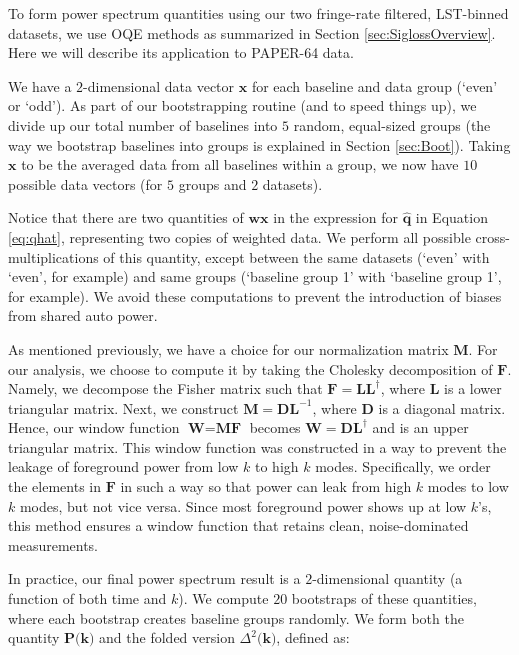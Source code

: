 \documentclass[preprint2,numberedappendix,tighten,twocolappendix]{aastex6}  %
\begin{document}
To form power spectrum quantities using our two fringe-rate filtered, LST-binned datasets, we use OQE methods as summarized in Section \ref{sec:SiglossOverview}. Here we will describe its application to PAPER-64 data. 

We have a $2$-dimensional data vector $\textbf{x}$ for each baseline and data group (`even' or `odd'). As part of our bootstrapping routine (and to speed things up), we divide up our total number of baselines into $5$ random, equal-sized groups (the way we bootstrap baselines into groups is explained in Section \ref{sec:Boot}). Taking $\textbf{x}$ to be the averaged data from all baselines within a group, we now have $10$ possible data vectors (for $5$ groups and $2$ datasets). 

Notice that there are two quantities of $\textbf{w}\textbf{x}$ in the expression for $\hat{\textbf{q}}$ in Equation \ref{eq:qhat}, representing two copies of weighted data. We perform all possible cross-multiplications of this quantity, except between the same datasets (`even' with `even', for example) and same groups (`baseline group 1' with `baseline group 1', for example). We avoid these computations to prevent the introduction of biases from shared auto power.

As mentioned previously, we have a choice for our normalization matrix $\textbf{M}$. For our analysis, we choose to compute it by taking the Cholesky decomposition of $\textbf{F}$. Namely, we decompose the Fisher matrix such that $\textbf{F} = \textbf{L}\textbf{L}^{\dagger}$, where $\textbf{L}$ is a lower triangular matrix. Next, we construct $\textbf{M} = \textbf{D}\textbf{L}^{-1}$, where \textbf{D} is a diagonal matrix. Hence, our window function $\textbf{W} = \textbf{MF}$ becomes $\textbf{W} = \textbf{D}\textbf{L}^{\dagger}$ and is an upper triangular matrix. This window function was constructed in a way to prevent the leakage of foreground power from low $k$ to high $k$ modes. Specifically, we order the elements in $\textbf{F}$ in such a way so that power can leak from high $k$ modes to low $k$ modes, but not vice versa. Since most foreground power shows up at low $k$'s, this method ensures a window function that retains clean, noise-dominated measurements.

In practice, our final power spectrum result is a $2$-dimensional quantity (a function of both time and $k$). We compute $20$ bootstraps of these quantities, where each bootstrap creates baseline groups randomly. We form both the quantity $\textbf{P(k)}$ and the folded version $\Delta^{2}\textbf{(k)}$, defined as:
\end{document}
